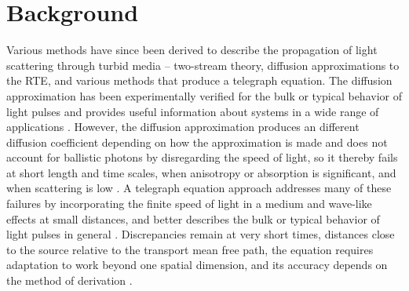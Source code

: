 \documentclass[floatfix,aps,prl,reprint,groupedaddress]{revtex4-2}
\begin{document}
\section{Background}

Various methods have since been derived to describe the propagation of light scattering through turbid media -- two-stream theory, diffusion approximations to the RTE, and various methods that produce a telegraph equation. The diffusion approximation has been experimentally verified for the bulk or typical behavior of light pulses and provides useful information about systems in a wide range of applications \cite{haskell_boundary_1994,allgaier_diffuse_2021, brown_light_1975, collis_lidar_1966,graaff_diffusion_2000, loumaigne_intrinsic_2015, aleandri_dynamic_2018, taitelbaum_diagnosis_1999,chandrasekhar_stochastic_1943,chandrasekhar_radiative_1950}. However, the diffusion approximation produces an different diffusion coefficient depending on how the approximation is made and does not account for ballistic photons by disregarding the speed of light, so it thereby fails at short length and time scales, when anisotropy or absorption is significant, and when scattering is low \cite{ishimaru_wave_nodate,yoo_time-resolved_1990, yoo_when_1990, durian_photon_1997, elaloufi_definition_2003, elaloufi_time-dependent_2002,zhang_wave_2002,graaff_diffusion_2000,pierrat_photon_2006}. A telegraph equation approach addresses many of these failures by incorporating the finite speed of light in a medium and wave-like effects at small distances, and better describes the bulk or typical behavior of light pulses in general \cite{goldstein_diffusion_1951,durian_two-stream_1996,masoliver_solutions_1992,masoliver_finite-velocity_1996,durian_photon_1997,lemieux_diffusing-light_1998, das_non-fickian_1998,weiss_applications_2002,hoenders_telegraphers_2005,polishchuk_photon-density_1997}. Discrepancies remain at very short times, distances close to the source relative to the transport mean free path, the equation requires adaptation to work beyond one spatial dimension, and its accuracy depends on the method of derivation \cite{durian_photon_1997, dudko_photon_2005, lemieux_diffusing-light_1998, heizler_asymptotic_2012,hoenders_telegraphers_2005,polishchuk_photon-density_1997}.
\end{document}
